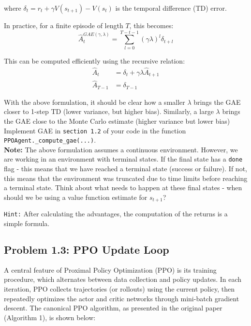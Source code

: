 \documentclass[12pt]{article}
\begin{document}
\noindent
where $\delta_t = r_t + \gamma V(s_{t+1}) - V(s_t)$ is the temporal difference (TD) error.

\noindent
In practice, for a finite episode of length $T$, this becomes:
\begin{equation}
\hat{A}_t^{GAE(\gamma,\lambda)} = \sum_{l=0}^{T-t-1} (\gamma\lambda)^l \delta_{t+l}
\end{equation}

\noindent
This can be computed efficiently using the recursive relation:
\begin{align}
\hat{A}_t &= \delta_t + \gamma\lambda \hat{A}_{t+1} \\
\hat{A}_{T-1} &= \delta_{T-1}
\end{align}


With the above formulation, it should be clear how a smaller $\lambda$ brings the GAE closer to 1-step TD (lower variance, but higher bias).  Similarly, a large $\lambda$ brings the GAE close to the Monte Carlo estimate (higher variance but lower bias)  \\


Implement GAE in \texttt{section 1.2} of your code in the function \texttt{PPOAgent.\_compute\_gae(...)}. \\

\noindent
\textbf{Note:} The above formulation assumes a continuous environment.  However, we are working in an environment with terminal states.  If the final state has a \texttt{done} flag - this means that we have reached a terminal state (success or failure).  If not, this means that the environment was truncated due to time limits before reaching a terminal state.  Think about what needs to happen at these final states - when should we be using a value function estimate for $s_{t+1}$?

\texttt{Hint:} After calculating the advantages, the computation of the returns is a simple formula.


\newpage

\subsection*{Problem 1.3: PPO Update Loop}

A central feature of Proximal Policy Optimization (PPO) is its training procedure, which alternates between data collection and policy updates. In each iteration, PPO collects trajectories (or rollouts) using the current policy, then repeatedly optimizes the actor and critic networks through mini-batch gradient descent. The canonical PPO algorithm, as presented in the original paper (Algorithm 1), is shown below:
\end{document}
